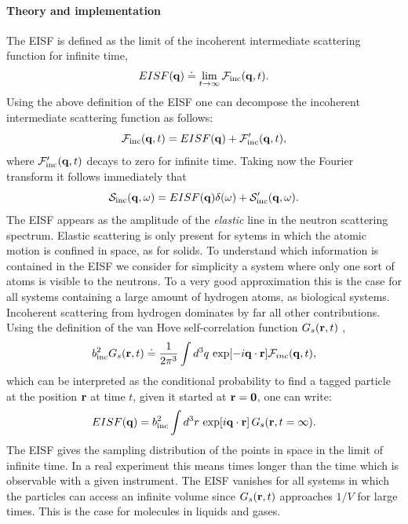 \documentclass[a4paper,11pt]{article}
\begin{document}
\paragraph{Theory and implementation\\}
\label{eisf_theory}
The \gls{EISF} is defined as the limit of the incoherent intermediate scattering function
for infinite time,
\begin{equation}
\label{eq:eisf}
EISF({\bf q}) \doteq \lim_{t \to \infty} {\cal F}_{\mathrm{inc}}({\bf q},t).
\end{equation}
Using the above definition of the EISF one can decompose the incoherent intermediate scattering function as follows:
\begin{equation}
{\cal F}_{\mathrm{inc}}({\bf q},t) = EISF({\bf q}) + {\cal F}_{\mathrm{inc}}'({\bf q},t),
\end{equation}
where ${\cal F}_{\mathrm{inc}}'({\bf q},t)$ decays to zero for infinite time.
Taking now the Fourier transform it follows immediately that
\begin{equation}
{\cal S}_{\mathrm{inc}}({\bf q},\omega) = EISF({\bf q})\delta(\omega)
+ {\cal S}'_{\mathrm{inc}}({\bf q},\omega).
\end{equation}
The \gls{EISF} appears as the amplitude of the {\em elastic} line in the neutron scattering spectrum. Elastic scattering is
only present for sytems in which the atomic motion is confined in space, as for solids. To understand which information
is contained in the \gls{EISF} we consider for simplicity a system where only one sort of atoms is visible to the neutrons.
To a very good approximation this is the case for all systems containing a large amount of hydrogen atoms, as biological
systems. Incoherent scattering from hydrogen dominates by far all other contributions. Using the definition of the van Hove
self-correlation function $G_s({\bf r},t)$ \cite{Lovesey},
\begin{equation}
b_{\mathrm{inc}}^2 G_s({\bf r},t) \doteq \frac{1}{2\pi^3}
\int d^3q\,\exp[-i{\bf q}\cdot{\bf r}] {\cal F}_{inc}({\bf q},t),
\end{equation}
which can be interpreted as the conditional probability to find a tagged particle at the position ${\bf r}$ at time $t$,
given it started at ${\bf r} = {\bf 0}$,  one can write:
\begin{equation}
\label{eq:eisf_g_s}
EISF({\bf q}) = b_{\mathrm{inc}}^2\int d^3r\,\exp[i{\bf q}\cdot{\bf r}]\,
G_s({\bf r},t=\infty).
\end{equation}
The \gls{EISF} gives the sampling distribution of the points in space in the limit of infinite time. In a real experiment this
means times longer than the time which is observable with a given instrument. The \gls{EISF} vanishes for all systems in which
the particles can access an infinite volume since $G_s({\bf r},t)$ approaches $1/V$ for large times. This is the case for
molecules in liquids and gases.
\end{document}
